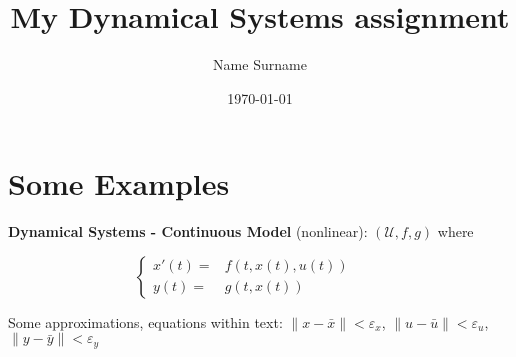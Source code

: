 \documentclass[12pt,a4paper]{article}
\title{My Dynamical Systems assignment}\let\Title\@title
\author{Name Surname}\let\Author\@author
\date{\today}           \let\Date\@date
\numberwithin{equation}{section}  %
\begin{document}
 
 
 \maketitle
 \newpage
 \tableofcontents
  \newpage
 \section{Some Examples}
 
 {\bf Dynamical Systems - Continuous Model} (nonlinear): $(\mathcal{U}, f, g)$ where

\begin{equation}
\label{eq:SDN}
\left\{ \begin{aligned}
        x'(t) = & f(t, x(t), u(t)) \ \\
        y(t) = & g(t, x(t)) \ 
       \end{aligned}
 \right.
 \qquad 
\end{equation}

Some approximations, equations within text: $\| x - \bar{x}\| < \varepsilon_x$, $\| u - \bar{u}\| < \varepsilon_u$, $\| y - \bar{y}\| < \varepsilon_y$
 
\end{document}
